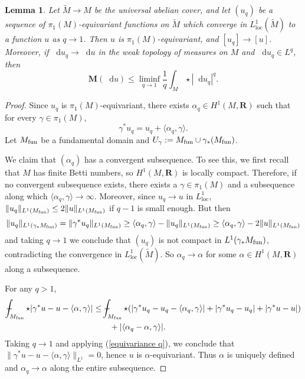 \documentclass[reqno,11pt]{amsart}
\newcommand{\RR}{\mathbf{R}}
\newcommand*\dif{\mathop{}\!\mathrm{d}}
\newcommand{\Mass}{\mathbf M}
\newcommand{\loc}{\mathrm{loc}}
\newtheorem{lemma}[theorem]{Lemma}
\theoremstyle{definition}
\numberwithin{equation}{section}
\def\Xint#1{\mathchoice
{\XXint\displaystyle\textstyle{#1}}%
{\XXint\textstyle\scriptstyle{#1}}%
{\XXint\scriptstyle\scriptscriptstyle{#1}}%
{\XXint\scriptscriptstyle\scriptscriptstyle{#1}}%
\!\int}
\def\XXint#1#2#3{{\setbox0=\hbox{$#1{#2#3}{\int}$ }
\vcenter{\hbox{$#2#3$ }}\kern-.6\wd0}}
\def\dashint{\Xint-}
\begin{document}
\begin{lemma}\label{L1 convergence preserves pi1}
Let $\tilde M \to M$ be the universal abelian cover, and let $(u_q)$ be a sequence of $\pi_1(M)$-equivariant functions on $\tilde M$ which converge in $L^1_\loc(\tilde M)$ to a function $u$ as $q \to 1$.
Then $u$ is $\pi_1(M)$-equivariant, and $[u_q] \to [u]$.
Moreover, if $\dif u_q \to \dif u$ in the weak topology of measures on $M$ and $\dif u_q \in L^q$, then
\begin{equation}\label{q to 1 Holder}
\Mass(\dif u) \leq \liminf_{q \to 1} \frac{1}{q} \int_M \star |\dif u_q|^q.
\end{equation}
\end{lemma}
\begin{proof}
Since $u_q$ is $\pi_1(M)$-equivariant, there exists $\alpha_q \in H^1(M, \RR)$ such that for every $\gamma \in \pi_1(M)$,
\begin{equation}\label{equivariance q}
	\gamma^* u_q = u_q + \langle \alpha_q, \gamma\rangle.
\end{equation}
Let $M_{\rm fun}$ be a fundamental domain and $U_\gamma := M_{\rm fun} \cup \gamma_* (M_{\rm fun})$.

We claim that $(\alpha_q)$ has a convergent subsequence.
To see this, we first recall that $M$ has finite Betti numbers, so $H^1(M, \RR)$ is locally compact.
Therefore, if no convergent subsequence exists, there exists a $\gamma \in \pi_1(M)$ and a subsequence along which $\langle \alpha_q, \gamma\rangle \to \infty$.
Moreover, since $u_q \to u$ in $L^1_\loc$, $\|u_q\|_{L^1(M_{\rm fun})} \leq 2\|u\|_{L^1(M_{\rm fun})}$ if $q - 1$ is small enough.
But then 
$$\|u_q\|_{L^1(\gamma_* M_{\rm fun})} = \|\gamma^* u_q\|_{L^1(M_{\rm fun})} \geq \langle \alpha_q, \gamma\rangle - \|u_q\|_{L^1(M_{\rm fun})} \geq \langle \alpha_q, \gamma\rangle - 2\|u\|_{L^1(M_{\rm fun})}$$
and taking $q \to 1$ we conclude that $(u_q)$ is not compact in $L^1(\gamma_* M_{\rm fun})$, contradicting the convergence in $L^1_\loc(\tilde M)$.
So $\alpha_q \to \alpha$ for some $\alpha \in H^1(M, \RR)$ along a subsequence.

For any $q > 1$,
\begin{align*}
\dashint_{M_{\rm fun}} \star |\gamma^* u - u - \langle \alpha, \gamma\rangle| 
&\leq \dashint_{M_{\rm fun}} \star (|\gamma^* u_q - u_q - \langle \alpha_q, \gamma\rangle| + |\gamma^* u_q - u_q| + |\gamma^* u - u|) \\
&\qquad + |\langle \alpha_q - \alpha, \gamma\rangle|.
\end{align*}
Taking $q \to 1$ and applying (\ref{equivariance q}), we conclude that $\|\gamma^* u - u - \langle \alpha, \gamma\rangle\|_{L^1} = 0$, hence $u$ is $\alpha$-equivariant.
Thus $\alpha$ is uniquely defined and $\alpha_q \to \alpha$ along the entire subsequence.


\end{proof}
\end{document}
